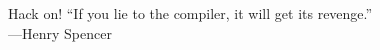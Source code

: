 \documentclass[mathserif,xcolor={dvipsnames,table}]{beamer}
\begin{document}
\begin{frame}{Hack on!}
``If you lie to the compiler, it will get its revenge.''\\
\hfill---Henry Spencer
\end{frame}

\begin{frame}
\end{frame}
\end{document}
